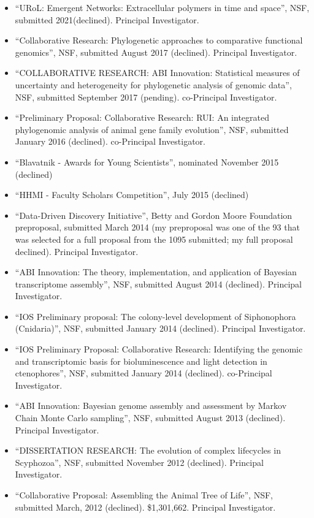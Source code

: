 \begin{itemize}

\item ``URoL: Emergent Networks: Extracellular polymers in time and space'', NSF, submitted 2021(declined). Principal Investigator.
\item ``Collaborative Research: Phylogenetic approaches to comparative functional genomics'', NSF, submitted August 2017 (declined). Principal Investigator.
\item ``COLLABORATIVE RESEARCH: ABI Innovation: Statistical measures of uncertainty and heterogeneity for phylogenetic analysis of genomic data'', NSF, submitted September 2017 (pending). co-Principal Investigator.
\item ``Preliminary Proposal: Collaborative Research: RUI: An integrated phylogenomic analysis of animal gene family evolution'', NSF, submitted January 2016 (declined). co-Principal Investigator.
\item ``Blavatnik - Awards for Young Scientists'', nominated November 2015 (declined)
\item ``HHMI - Faculty Scholars Competition'', July 2015 (declined)
\item ``Data-Driven Discovery Initiative'', Betty and Gordon Moore Foundation preproposal, submitted March 2014 (my preproposal was one of the 93 that was selected for a full proposal from the 1095 submitted; my full proposal declined). Principal Investigator.
\item ``ABI Innovation: The theory, implementation, and application of Bayesian transcriptome assembly'', NSF, submitted August 2014 (declined). Principal Investigator.
\item ``IOS Preliminary proposal: The colony-level development of Siphonophora (Cnidaria)'', NSF, submitted January 2014 (declined). Principal Investigator.
\item ``IOS Preliminary Proposal: Collaborative Research: Identifying the genomic and transcriptomic basis for bioluminescence and light detection in ctenophores'', NSF, submitted January 2014 (declined). co-Principal Investigator.
\item ``ABI Innovation: Bayesian genome assembly and assessment by Markov Chain Monte Carlo sampling'', NSF, submitted August 2013 (declined). Principal Investigator.
\item ``DISSERTATION RESEARCH: The evolution of complex lifecycles in Scyphozoa'', NSF, submitted November 2012 (declined). Principal Investigator.
\item ``Collaborative Proposal: Assembling the Animal Tree of Life'', NSF, submitted March, 2012 (declined). \$1,301,662. Principal Investigator.

\end{itemize}

